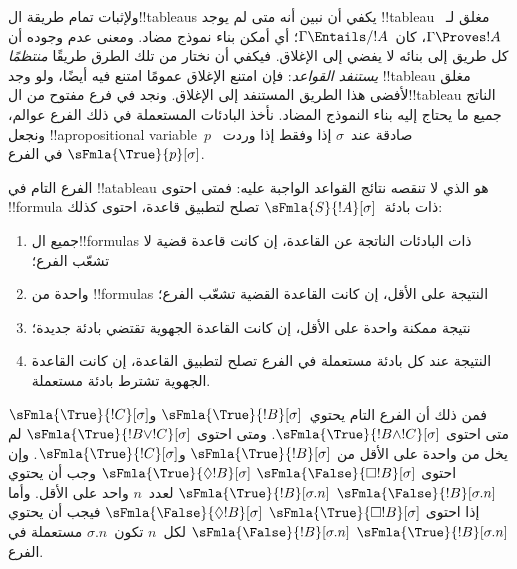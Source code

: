 \documentclass[../../../include/open-logic-section]{subfiles}
\begin{document}


\begin{explain}
  ولإثبات تمام طريقة ال!!{tableau}s يكفي أن نبين أنه متى لم يوجد
  !!{tableau} مغلق لـ~$\Gamma \Proves !A$، كان~$\Gamma \Entails/ !A$؛
  أي أمكن بناء نموذج مضاد. ومعنى عدم وجوده أن كل طريق إلى بنائه لا يفضي
  إلى الإغلاق. فيكفي أن نختار من تلك الطرق طريقًا
  \emph{منتظمًا يستنفد القواعد}: فإن امتنع الإغلاق عمومًا امتنع فيه
  أيضًا، ولو وجد !!{tableau} مغلق لأفضى هذا الطريق المستنفد إلى
  الإغلاق. ونجد في فرع مفتوح من ال!!{tableau} الناتج جميع ما يحتاج إليه
  بناء النموذج المضاد. نأخذ البادئات المستعملة في ذلك الفرع عوالم،
  ونجعل !!a{propositional variable}~$p$ صادقة عند~$\sigma$ إذا وفقط إذا
  وردت~$\sFmla{\True}{p}[\sigma]$ في الفرع.
\end{explain}

\begin{defn}
  الفرع التام في !!a{tableau} هو الذي لا تنقصه نتائج القواعد الواجبة
  عليه: فمتى احتوى !!{formula} ذات بادئة~$\sFmla{S}{!A}[\sigma]$
  تصلح لتطبيق قاعدة، احتوى كذلك:
  \begin{enumerate}
    \item جميع ال!!{formula}s ذات البادئات الناتجة عن القاعدة، إن
      كانت قاعدة قضية لا تشعّب الفرع؛
    \item واحدة من !!{formula}s النتيجة على الأقل، إن كانت القاعدة
      القضية تشعّب الفرع؛
    \item نتيجة ممكنة واحدة على الأقل، إن كانت القاعدة الجهوية
      تقتضي بادئة جديدة؛
    \item النتيجة عند كل بادئة مستعملة في الفرع تصلح لتطبيق القاعدة،
      إن كانت القاعدة الجهوية تشترط بادئة مستعملة.
  \end{enumerate}
\end{defn}

\begin{explain}
فمن ذلك أن الفرع التام يحتوي~$\sFmla{\True}{!B}[\sigma]$
و$\sFmla{\True}{!C}[\sigma]$ متى احتوى
$\sFmla{\True}{!B \land !C}[\sigma]$. ومتى احتوى
$\sFmla{\True}{!B \lor !C}[\sigma]$ لم يخل من واحدة على الأقل من
$\sFmla{\True}{!B}[\sigma]$ و$\sFmla{\True}{!C}[\sigma]$.
وإن احتوى
 {$\sFmla{\False}{\Box !B}[\sigma]$}
{$\sFmla{\True}{\Diamond !B}[\sigma]$} وجب أن يحتوي
 {$\sFmla{\False}{!B}[\sigma.n]$}
{$\sFmla{\True}{!B}[\sigma.n]$} لعدد~$n$ واحد على الأقل.
وأما إذا احتوى
 {$\sFmla{\True}{\Box !B}[\sigma]$}
{$\sFmla{\False}{\Diamond !B}[\sigma]$} فيجب أن يحتوي
 {$\sFmla{\True}{!B}[\sigma.n]$}
{$\sFmla{\False}{!B}[\sigma.n]$} لكل~$n$ تكون~$\sigma.n$
مستعملة في الفرع.
\end{explain}
\end{document}
